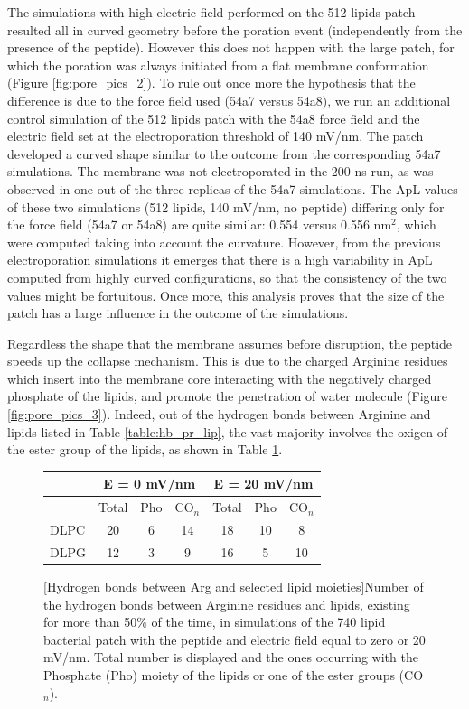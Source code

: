 The simulations with high electric field performed on the 512 lipids patch resulted all in curved geometry before the poration event (independently from the presence of the peptide). However this does not happen with the large patch, for which the poration was always initiated from a flat membrane conformation (Figure \ref{fig:pore_pics_2}).
%
To rule out once more the hypothesis that the difference is due to the force field used (54a7 versus 54a8), we run an additional control simulation of the 512 lipids patch with the 54a8 force field and the electric field set at the electroporation threshold of 140 mV/nm. The patch developed a curved shape similar to the outcome from the corresponding 54a7 simulations. The membrane was not electroporated in the 200 ns run, as was observed in one out of the three replicas of the 54a7 simulations.
%
The ApL values of these two simulations (512 lipids, 140 mV/nm, no peptide) differing only for the force field (54a7 or 54a8) are quite similar: 0.554 versus 0.556 nm$^2$, which were computed taking into account the curvature.
%
However, from the previous electroporation simulations it emerges that there is a high variability in ApL computed from highly curved configurations, so that the consistency of the two values might be fortuitous.
%
Once more, this analysis proves that the size of the patch has a large influence in the outcome of the simulations.

Regardless the shape that the membrane assumes before disruption, the peptide speeds up the collapse mechanism. This is due to the charged Arginine residues which insert into the membrane core interacting with the negatively charged phosphate of the lipids, and promote the penetration of water molecule (Figure \ref{fig:pore_pics_3}).
%
Indeed, out of the hydrogen bonds between Arginine and lipids listed in Table \ref{table:hb_pr_lip}, the vast majority involves the oxigen of the ester group of the lipids, as shown in Table \ref{table:hb_ester}.

\begin{figure}[t!]
\centering
 \def\arraystretch{1.6}
\begin{tabular}{l|ccc|ccc}
\hline
& \multicolumn{3}{c|}{\textbf{E = 0 mV/nm}} & \multicolumn{3}{c}{\textbf{E = 20 mV/nm}} \\
\hline
& Total & Pho & CO$_n$ & Total & Pho & CO$_n$ \\ 
\hline
DLPC & 20 & 6 & 14 & 18 & 10 & 8 \\
DLPG &12 & 3 & 9 & 16 & 5 & 10 \\
\hline
 \end{tabular}
[Hydrogen bonds between Arg and selected lipid moieties]{Number of the hydrogen bonds between Arginine residues and lipids, existing for more than 50\% of the time, in simulations of the 740 lipid bacterial patch with the peptide and electric field equal to zero or 20 mV/nm. Total number is displayed and the ones occurring with the Phosphate (Pho) moiety of the lipids or one of the ester groups (CO$_n$).}
\label{table:hb_ester}
\end{figure}

